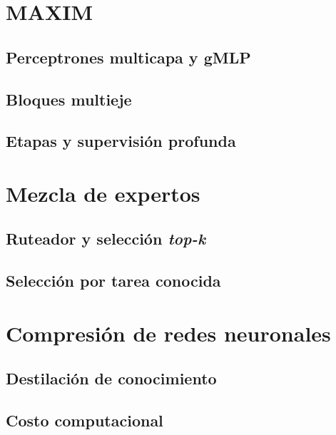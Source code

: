 \documentclass[
  11pt,
  oneside,
  english,
  spanish,
  singlespacing,
  headsepline
]{MastersDoctoralThesis}
\begin{document}
\section{MAXIM}
\label{sec:maxim}

\subsection{Perceptrones multicapa y gMLP}
\label{sec:gmlp}

\subsection{Bloques multieje}
\label{sec:multieje}

\subsection{Etapas y supervisión profunda}
\label{sec:supervision-profunda}

\section{Mezcla de expertos}
\label{sec:moe}

\subsection{Ruteador y selección \textit{top-k}}
\label{sec:ruteador}

\subsection{Selección por tarea conocida}
\label{sec:oracle}

\section{Compresión de redes neuronales}
\label{sec:compresion-redes}

\subsection{Destilación de conocimiento}
\label{sec:destilacion}

\subsection{Costo computacional}
\label{sec:costo}
\end{document}
